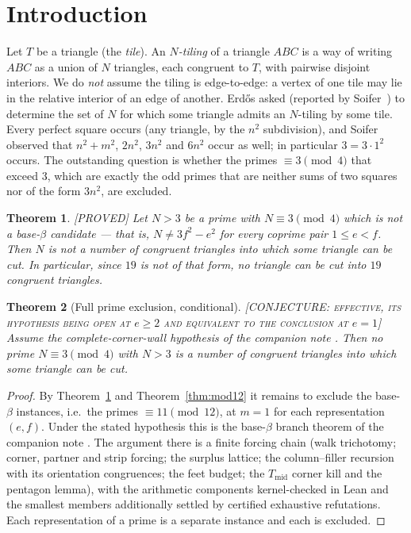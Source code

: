 \documentclass[11pt,reqno]{amsart}
\theoremstyle{plain}
\newtheorem{theorem}{Theorem}
\theoremstyle{definition}
\newcommand{\lab}[1]{\hfill\textnormal{\footnotesize\textsc{[#1]}}}
\begin{document}
\maketitle

\section{Introduction}

Let $T$ be a triangle (the \emph{tile}). An \emph{$N$-tiling} of a triangle $ABC$ is a way of
writing $ABC$ as a union of $N$ triangles, each congruent to $T$, with pairwise disjoint interiors.
We do \emph{not} assume the tiling is edge-to-edge: a vertex of one tile may lie in the relative
interior of an edge of another. Erd\H{o}s asked (reported by Soifer~\cite{Soifer}) to determine the
set of $N$ for which some triangle admits an $N$-tiling by some tile. Every perfect square occurs
(any triangle, by the $n^2$ subdivision), and Soifer observed that $n^2+m^2$, $2n^2$, $3n^2$ and
$6n^2$ occur as well; in particular $3=3\cdot 1^2$ occurs. The outstanding question is whether the
primes $\equiv 3\pmod 4$ that exceed $3$, which are exactly the odd primes that are neither sums of
two squares nor of the form $3n^2$, are excluded.

\begin{theorem}\label{thm:main}\lab{PROVED}
Let $N>3$ be a prime with $N\equiv 3\pmod 4$ which is \emph{not} a base-$\beta$ candidate --- that is,
$N\ne 3f^2-e^2$ for every coprime pair $1\le e<f$. Then $N$ is not a number of congruent triangles
into which some triangle can be cut. In particular, since $19$ is not of that form, no triangle can be
cut into $19$ congruent triangles.
\end{theorem}

\begin{theorem}[Full prime exclusion, conditional]\label{thm:fullprime}\lab{CONJECTURE: effective, its hypothesis being open at $e\ge2$ and equivalent to the conclusion at $e=1$}
Assume the complete-corner-wall hypothesis of the companion note \cite[Hyp.~5.1]{Companion}. Then no
prime $N\equiv 3\pmod 4$ with $N>3$ is a number of congruent triangles into which some triangle can
be cut.
\end{theorem}
\begin{proof}
By Theorem~\ref{thm:main} and Theorem~\ref{thm:mod12} it remains to exclude the base-$\beta$
instances, i.e.\ the primes $\equiv 11\pmod{12}$, at $m=1$ for each representation $(e,f)$. Under the
stated hypothesis this is the base-$\beta$ branch theorem of the companion note \cite{Companion}. The
argument there is a finite forcing chain (walk trichotomy; corner, partner and strip forcing; the
surplus lattice; the column--filler recursion with its orientation congruences; the feet budget; the
$T_{\mathrm{mid}}$ corner kill and the pentagon lemma), with the arithmetic components kernel-checked
in Lean and the smallest members additionally settled by certified exhaustive refutations. Each
representation of a prime is a separate instance and each is excluded.
\end{proof}
\end{document}
